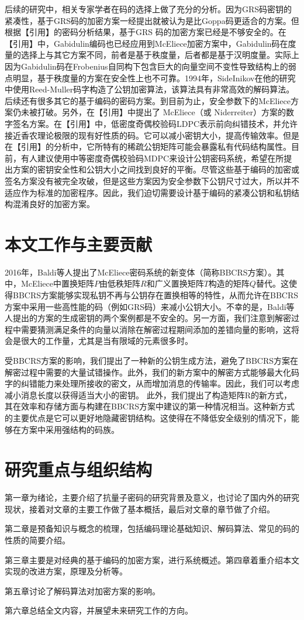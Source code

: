 后续的研究中，相关专家学者在码的选择上做了充分的分析。因为GRS码密钥的紧凑性，基于GRS码的加密方案一经提出就被认为是比Goppa码更适合的方案。但根据【引用】的密码分析结果，基于GRS 码的加密方案已经是不够安全的。在【引用】中，Gabidulin编码也已经应用到McEliece加密方案中，Gabidulin码在度量的选择上与其它方案不同，前者是基于秩度量，后者都是基于汉明度量。实际上因为Gabidulin码在Frobenius自同构下包含巨大的向量空间不变性导致结构上的弱点明显，基于秩度量的方案在安全性上也不可靠。1994年，SideInikov在他的研究中使用Reed-Muller码字构造了公钥加密算法，该算法具有非常高效的解码算法。后续还有很多其它的基于编码的密码方案。到目前为止，安全参数下的McEliece方案仍未被打破。另外，在【引用】中提出了 McEliece（或 Niderreiter）方案的数字签名方案。在【引用】中，低密度奇偶校验码LDPC表示前向纠错技术，并允许接近香农理论极限的现有好性质的码。它可以减小密钥大小，提高传输效率。但是在【引用】的分析中，它所特有的稀疏公钥矩阵可能会暴露私有代码结构属性。目前，有人建议使用中等密度奇偶校验码MDPC来设计公钥密码系统，希望在所提出方案的密钥安全性和公钥大小之间找到良好的平衡。尽管这些基于编码的加密或签名方案没有被完全攻破，但是这些方案因为安全参数下公钥尺寸过大，所以并不适应作为标准的加密程序。因此，我们迫切需要设计基于编码的紧凑公钥和私钥结构混淆良好的加密方案。

\section{本文工作与主要贡献}
2016年，Baldi等人提出了McEliece密码系统的新变体（简称BBCRS方案）。其中，McEliece中置换矩阵$P$由低秩矩阵$R$和广义置换矩阵$T$构造的矩阵$Q$替代。这使得BBCRS方案能够实现私钥不再与公钥存在置换相等的特性，从而允许在BBCRS方案中采用一些高性能的码（例如GRS码）来减小公钥大小。不幸的是，Baldi等人提出的方案的生成密钥的两个案例都是不安全的。另一方面，我们注意到解密过程中需要猜测满足条件的向量以消除在解密过程期间添加的差错向量的影响，这将会是很大的工作量，尤其是当有限域的元素很多时。

受BBCRS方案的影响，我们提出了一种新的公钥生成方法，避免了BBCRS方案在解密过程中需要的大量试错操作。此外，我们的新方案中的解密方式能够最大化码字的纠错能力来处理所接收的密文，从而增加消息的传输率。因此，我们可以考虑减小消息长度以获得适当大小的密钥。 此外，我们提出了构造矩阵R的新方式，其在效率和存储方面与构建在BBCRS方案中建议的第一种情况相当。这种新方式的主要优点是它可以更好地隐藏密钥结构。这使得在不降低安全级别的情况下，能够在方案中采用强结构的码族。

\section{研究重点与组织结构}
第一章为绪论，主要介绍了抗量子密码的研究背景及意义，也讨论了国内外的研究现状，接着对文章的主要工作做了基本概括，最后对文章的章节做了介绍。

第二章是预备知识与概念的梳理，包括编码理论基础知识、解码算法、常见的码的性质的简要介绍。

第三章主要是对经典的基于编码的加密方案，进行系统概述。第四章着重介绍本文实现的改进方案，原理及分析等。

第五章讨论了解码算法对加密方案的影响。

第六章总结全文内容，并展望未来研究工作的方向。